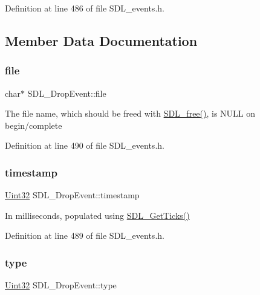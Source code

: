 Definition at line 486 of file S\+D\+L\+\_\+events.\+h.



\subsection{Member Data Documentation}
\mbox{\label{struct_s_d_l___drop_event_abc41ef4beb62e1d8b56827128b29585f}} 
\subsubsection{\texorpdfstring{file}{file}}
{\footnotesize\ttfamily char$\ast$ S\+D\+L\+\_\+\+Drop\+Event\+::file}

The file name, which should be freed with \mbox{\hyperlink{_s_d_l__stdinc_8h_a0e4ade894d550ada1fa19dc2d46e88b8}{S\+D\+L\+\_\+free()}}, is N\+U\+LL on begin/complete 

Definition at line 490 of file S\+D\+L\+\_\+events.\+h.

\mbox{\label{struct_s_d_l___drop_event_a02d2c81bb22db632a40cd0021ff751ab}} 
\subsubsection{\texorpdfstring{timestamp}{timestamp}}
{\footnotesize\ttfamily \mbox{\hyperlink{_s_d_l__stdinc_8h_add440eff171ea5f55cb00c4a9ab8672d}{Uint32}} S\+D\+L\+\_\+\+Drop\+Event\+::timestamp}

In milliseconds, populated using \mbox{\hyperlink{_s_d_l__timer_8h_a0b9bc71d6287e0ffafdc3419760fe2b3}{S\+D\+L\+\_\+\+Get\+Ticks()}} 

Definition at line 489 of file S\+D\+L\+\_\+events.\+h.

\mbox{\label{struct_s_d_l___drop_event_a5ea27cfaa5f8d4940e9a69b68b3cc035}} 
\subsubsection{\texorpdfstring{type}{type}}
{\footnotesize\ttfamily \mbox{\hyperlink{_s_d_l__stdinc_8h_add440eff171ea5f55cb00c4a9ab8672d}{Uint32}} S\+D\+L\+\_\+\+Drop\+Event\+::type}

